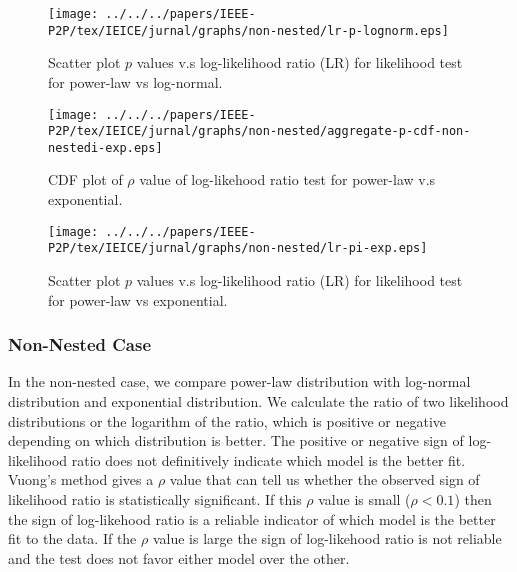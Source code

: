 \begin{figure}[!tb]
\begin{center}
\texttt{[image: ../../../papers/IEEE-P2P/tex/IEICE/jurnal/graphs/non-nested/lr-p-lognorm.eps]}
\end{center}
\caption{Scatter plot $p$ values v.s log-likelihood
         ratio (LR) for likelihood test for power-law vs log-normal.} 
\label{fig:scatter-lognorm}
\end{figure}

\begin{figure}[!tb]
\begin{center}
\texttt{[image: ../../../papers/IEEE-P2P/tex/IEICE/jurnal/graphs/non-nested/aggregate-p-cdf-non-nestedi-exp.eps]}
\end{center}
\caption{CDF plot of $\rho$ value of log-likehood ratio test for power-law v.s exponential.} 
\label{fig:cdf-p-exp}
\end{figure}

\begin{figure}[!tb]
\begin{center}
\texttt{[image: ../../../papers/IEEE-P2P/tex/IEICE/jurnal/graphs/non-nested/lr-pi-exp.eps]}
\end{center}
\caption{Scatter plot $p$ values v.s log-likelihood 
         ratio (LR) for likelihood test for power-law vs exponential.} 
\label{fig:scatter-exp}
\end{figure}

\subsubsection{Non-Nested Case}
In the non-nested case, we compare power-law distribution with log-normal distribution and exponential distribution.
We calculate the ratio of two likelihood distributions or the logarithm of the ratio, which is positive or negative depending on which distribution is better.
The positive or negative sign of log-likelihood ratio does not definitively indicate which model is the better fit. 
Vuong's \cite{vuong1989likelihood}  method gives a $\rho$ value that can tell us whether the observed sign of likelihood ratio is statistically significant.
If this $\rho$ value is small ($\rho < 0.1$) then the sign of log-likehood ratio is a reliable indicator of which model is the better fit to the data. 
If the $\rho$ value is large the sign of log-likehood ratio is not reliable and the test does not favor either model over the other. 

